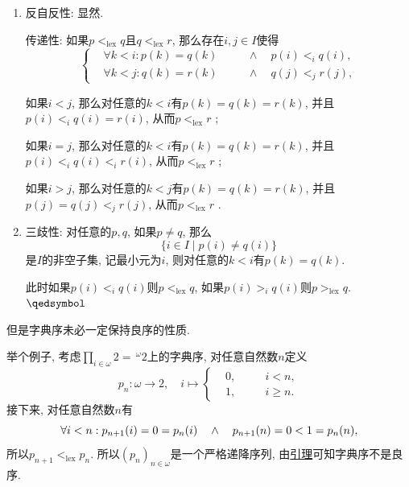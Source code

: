 \begin{enumerate}
    \item 反自反性: 显然.
    
    \hspace{2.17em}
    传递性: 如果$p<_{\mathrm{lex}}q$且$q<_{\mathrm{lex}}r$, 那么存在$i,j\in I$使得
    \vspace{3pt}
    \[\left\{\begin{aligned}
        &\forall k<i:p(k)=q(k)&&\quad\land\quad p(i)<_iq(i),\\[-3pt]
        &\forall k<j:q(k)=r(k)&&\quad\land\quad q(j)<_jr(j),
    \end{aligned}\right.\]
    
    \vspace{3pt}\hspace{2.17em}
    如果$i<j$, 那么对任意的$k<i$有$p(k)=q(k)=r(k)$,
    并且$p(i)<_iq(i)=r(i)$, 从而$p<_{\mathrm{lex}}r$ ;

    \hspace{2.17em}
    如果$i=j$, 那么对任意的$k<i$有$p(k)=q(k)=r(k)$,
    并且$p(i)<_iq(i)<_ir(i)$, 从而$p<_{\mathrm{lex}}r$ ;

    \hspace{2.17em}
    如果$i>j$, 那么对任意的$k<j$有$p(k)=q(k)=r(k)$,
    并且$p(j)=q(j)<_jr(j)$, 从而$p<_{\mathrm{lex}}r$ .

    \item 三歧性: 对任意的$p,q$, 如果$p\neq q$, 那么
    \[
        \{i\in I\mid p(i)\neq q(i)\}
    \]
    是$I$的非空子集, 记最小元为$i$, 则对任意的$k<i$有$p(k)=q(k)$.

    \hspace{2.17em}
    此时如果$p(i)<_iq(i)$则$p<_{\mathrm{lex}}q$,
    如果$p(i)>_iq(i)$则$p>_{\mathrm{lex}}q$. \hfill $\qedsymbol$
\end{enumerate}

\vspace{10pt}

但是字典序未必一定保持良序的性质.

举个例子, 考虑$\displaystyle\prod_{i\in\omega}2=\,\!^\omega2$上的字典序,
对任意自然数$n$定义
\vspace{-3pt}
\[
    p_n:\omega\to 2,\quad i\mapsto\left\{\begin{aligned}
        &0,\quad&&i<n,\\[-3pt]
        &1,\quad&&i\geqslant n.
    \end{aligned}\right.
\]
接下来, 对任意自然数$n$有
\[
    \forall i<n:p_{n+1}(i)=0=p_n(i)\quad\land\quad p_{n+1}(n)=0<1=p_n(n),\\[3pt]
\]
所以$p_{n+1}<_{\mathrm{lex}}p_n$. 所以$(p_n)_{n\in\omega}$是一个严格递降序列,
由\href{04 良序关系#nameddest=sec:定理1.2}{引理}可知字典序不是良序.






